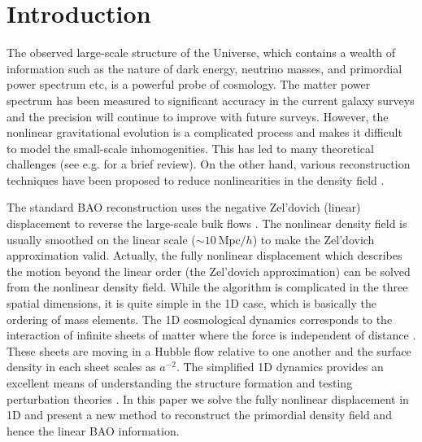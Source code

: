 \documentclass[aps,prd,twocolumn,showpacs,superscriptaddress,groupedaddress,nofootinbib]{revtex4}  %
\newcommand{\mr}{\mathrm}
\begin{document}
\pacs{}
\maketitle


\section{Introduction}
The observed large-scale structure of the Universe, which contains a wealth of 
information such as the nature of dark energy, neutrino masses, and primordial
power spectrum etc, is a powerful probe of cosmology.
The matter power spectrum has been measured to significant accuracy in the 
current galaxy surveys and the precision will continue to improve with future 
surveys. 
However, the nonlinear gravitational evolution is a complicated process and 
makes it difficult to model the small-scale inhomogenities. This has led to
many theoretical challenges (see e.g. \cite{2016matt} for a brief review).
On the other hand, various reconstruction techniques have been proposed to 
reduce nonlinearities in the density field \cite{2007bao,2015PhRvD..92l3522S}. 
 
The standard BAO reconstruction uses the negative
Zel'dovich (linear) displacement to reverse the large-scale bulk flows 
\cite{2007bao}. 
The nonlinear density field is usually smoothed on the linear scale 
($\sim10\ \mr{Mpc}/h$) to make the Zel'dovich approximation valid.
Actually, the fully nonlinear displacement which describes the motion beyond
the linear order (the Zel'dovich approximation) can be solved from the nonlinear
density field.
While the algorithm is complicated in the three spatial dimensions, it is 
quite simple in the 1D case, which is basically the ordering of mass elements.
The 1D cosmological dynamics corresponds to the interaction of infinite sheets
of matter where the force is independent of distance \cite{2016matt}.
These sheets are moving in a Hubble flow relative to one another and the surface
density in each sheet scales as $a^{-2}$.
The simplified 1D dynamics provides an excellent means of understanding the 
structure formation and testing perturbation theories \cite{2016matt}.
In this paper we solve the fully nonlinear displacement in 1D and present
a new method to reconstruct the primordial density field and hence the linear 
BAO information.
\end{document}
